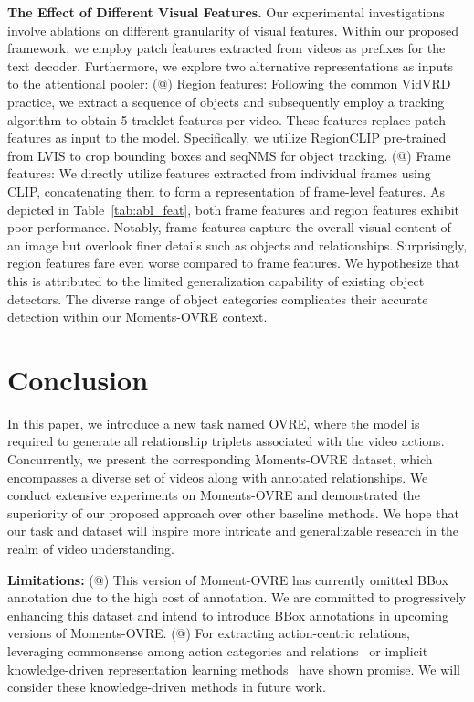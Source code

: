 \documentclass[letterpaper]{article}
\makeatletter
\newcommand{\Rmnum}[1]{\expandafter\@slowromancap\romannumeral #1@}
\makeatother
\begin{document}
\noindent \textbf{The Effect of Different Visual Features.}
Our experimental investigations involve ablations on different granularity of visual features. Within our proposed framework, we employ patch features extracted from videos as prefixes for the text decoder. Furthermore, we explore two alternative representations as inputs to the attentional pooler:
(\Rmnum{1}) Region features: Following the common VidVRD practice, we extract a sequence of objects and subsequently employ a tracking algorithm to obtain 5 tracklet features per video. These features replace patch features as input to the model. Specifically, we utilize RegionCLIP \cite{zhong2021regionclip} pre-trained from LVIS to crop bounding boxes and seqNMS \cite{han2016seqnms} for object tracking.
(\Rmnum{2}) Frame features: We directly utilize features extracted from individual frames using CLIP, concatenating them to form a representation of frame-level features.
As depicted in Table~\ref{tab:abl_feat}, both frame features and region features exhibit poor performance. Notably, frame features capture the overall visual content of an image but overlook finer details such as objects and relationships. Surprisingly, region features fare even worse compared to frame features. We hypothesize that this is attributed to the limited generalization capability of existing object detectors. The diverse range of object categories complicates their accurate detection within our Moments-OVRE context.



\vspace{-3.22mm}
\section{Conclusion}
In this paper, we introduce a new task named OVRE, where the model is required to generate all relationship triplets associated with the video actions. Concurrently, we present the corresponding Moments-OVRE dataset, which encompasses a diverse set of videos along with annotated relationships. We conduct extensive experiments on Moments-OVRE and demonstrated the superiority of our proposed approach over other baseline methods. We hope that our task and dataset will inspire more intricate and generalizable research in the realm of video understanding.

\hspace*{\fill}  \noindent \textbf{Limitations:}
(\Rmnum{1}) This version of Moment-OVRE has currently omitted BBox annotation due to the high cost of annotation. We are committed to progressively enhancing this dataset and intend to introduce BBox annotations in upcoming versions of Moments-OVRE.
(\Rmnum{2}) For extracting action-centric relations, leveraging commonsense among action categories and relations~\cite{yang2018commonsense} or implicit knowledge-driven representation learning methods~\cite{li2023knowledge, li2018deep} have shown promise. We will consider these knowledge-driven methods in future work.
\end{document}

